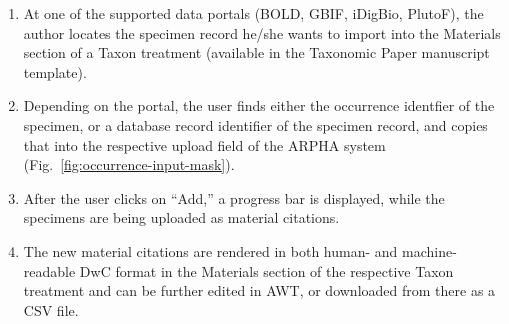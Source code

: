 \begin{enumerate}
\item{At one of the supported data portals (BOLD, GBIF, iDigBio, PlutoF), the author locates the specimen record he/she wants to import into the Materials section of a Taxon treatment (available in the Taxonomic Paper manuscript template).}
\item{Depending on the portal, the user finds either the occurrence identfier of the specimen, or a database record identifier of the specimen record, and copies that into the respective upload field of the ARPHA system (Fig.~\ref{fig:occurrence-input-mask}).}
\item{After the user clicks on ``Add,'' a progress bar is displayed, while the specimens are being uploaded as material citations.}
\item{The new material citations are rendered in both human- and machine-readable DwC format in the Materials section of the respective Taxon treatment and can be further edited in AWT, or downloaded from there as a CSV file.}
\end{enumerate}

